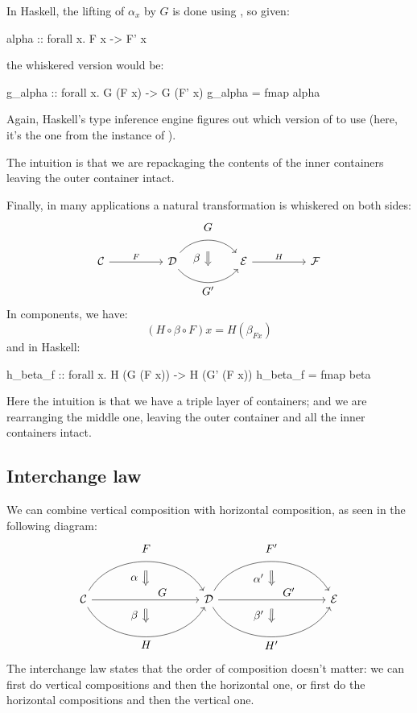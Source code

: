 \documentclass[DaoFP]{subfiles}
\begin{document}
In Haskell, the lifting of $\alpha_x$ by $G$ is done using , so given:
\begin{haskell}
alpha :: forall x. F x -> F' x
\end{haskell}
the whiskered version would be:
\begin{haskell}
g_alpha :: forall x. G (F x) -> G (F' x)
g_alpha = fmap alpha
\end{haskell}
Again, Haskell's type inference engine figures out which version of  to use (here, it's the one from the  instance of ).

The intuition is that we are repackaging the contents of the inner containers leaving the outer container intact.

Finally, in many applications a natural transformation is whiskered on both sides:
\[
\begin{tikzcd}[column sep=huge]
\mathcal{C}
 \arrow[r, "F"]
 &
\mathcal{D}
  \arrow[bend left=50]{r}[name=U1, label=above:$G$]{}
  \arrow[bend right=50]{r}[name=D1, label=below:$G'$]{} 
 &
\mathcal{E}
  \arrow[shorten <=10pt,shorten >=10pt,Rightarrow,to path={(U1) -- node[label=left:$\beta$] {} (D1)}]{}
  \arrow[r, "H"]
 &
 \mathcal{F}
\end{tikzcd}
\]
In components, we have:
\[ (H \circ \beta \circ F) x = H (\beta_{F x})\]
and in Haskell:
\begin{haskell}
h_beta_f :: forall x. H (G (F x)) -> H (G' (F x))
h_beta_f = fmap beta
\end{haskell}

Here the intuition is that we have a triple layer of containers; and we are rearranging the middle one, leaving the outer container and all the inner containers intact.

\subsection{Interchange law}

We can combine vertical composition with horizontal composition, as seen in the following diagram:
\[
\begin{tikzcd}[column sep=huge]
\mathcal{C}
  \arrow[bend left=60]{rr}[name=U, label=above:$F$]{}
  \arrow[]{rr}[name=M, label={[xshift=15pt, yshift=-5pt]:$G$}]{} 
  \arrow[bend right=60]{rr}[name=D, label=below:$H$]{} 
 &&
\mathcal{D}
  \arrow[bend left=60]{rr}[name=U1, label=above:$F'$]{}
  \arrow[]{rr}[name=M1, label={[xshift=15pt, yshift=-5pt]:$G'$}]{} 
  \arrow[bend right=60]{rr}[name=D1, label=below:$H'$]{} 
&&
\mathcal{E}
  \arrow[shorten <=8pt, shorten >=8pt,Rightarrow, to path={(U) -- node[label=left:$\alpha$] {} (M)}]{}
  \arrow[shorten <=8pt, shorten >=8pt,Rightarrow, to path={(M) -- node[label=left:$\beta$] {} (D)}]{}
  \arrow[shorten <=8pt, shorten >=8pt,Rightarrow, to path={(U1) -- node[label=left:$\alpha'$] {} (M1)}]{}
  \arrow[shorten <=8pt, shorten >=8pt,Rightarrow, to path={(M1) -- node[label=left:$\beta'$] {} (D1)}]{}
\end{tikzcd}
\]
The interchange law states that the order of composition doesn't matter: we can first do vertical compositions and then the horizontal one, or first do the horizontal compositions and then the vertical one.
\end{document}
